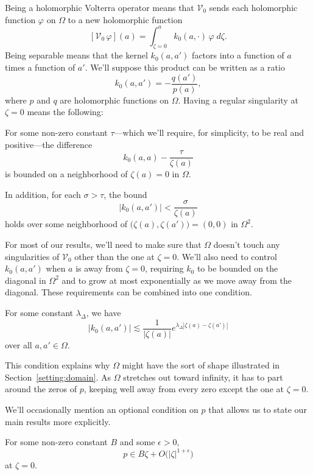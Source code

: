 \documentclass{article}
\makeatletter
\theoremstyle{plain}
\newcommand{\condconst}[2]{\item[($\text{\textsc{#1}} \mid #2$)]\protected@edef\@currentlabel{$\text{\textsc{#1}} \mid #2$}}
\newcommand{\hardpart}{\mathcal{V}_0}
\newcommand{\hardker}{k_0}
\newcommand{\domain}{\Omega}
\makeatother
\begin{document}
Being a holomorphic Volterra operator means that $\hardpart$ sends each holomorphic function $\varphi$ on $\domain$ to a new holomorphic function
\[ [\hardpart\,\varphi](a) = \int_{\zeta = 0}^a \hardker(a, \cdot)\,\varphi\;d\zeta. \]
Being separable means that the kernel $\hardker(a, a')$ factors into a function of $a$ times a function of $a'$. We'll suppose this product can be written as a ratio
\[ \hardker(a, a') = - \frac{q(a')}{p(a)}, \]
where $p$ and $q$ are holomorphic functions on $\domain$. Having a regular singularity at $\zeta = 0$ means the following:
\begin{conditions}
\condconst{sing}{\tau}\label{cond:sing} For some non-zero constant $\tau$---which we'll require, for simplicity, to be real and positive---the difference
\[ \hardker(a, a) - \frac{\tau}{\zeta(a)} \]
is bounded on a neighborhood of $\zeta(a) = 0$ in $\domain$.

In addition, for each $\sigma > \tau$, the bound
\[ \big|\hardker(a, a')\big| < \frac{\sigma}{\zeta(a)} \]
holds over some neighborhood of $\big(\zeta(a), \zeta(a')\big) = (0, 0)$ in $\domain^2$.
\end{conditions}
For most of our results, we'll need to make sure that $\domain$ doesn't touch any singularities of $\hardpart$ other than the one at $\zeta = 0$. We'll also need to control $\hardker(a, a')$ when $a$ is away from $\zeta = 0$, requiring $\hardker$ to be bounded on the diagonal in $\domain^2$ and to grow at most exponentially as we move away from the diagonal. These requirements can be combined into one condition.
\begin{conditions}
\condconst{diag$_0$}{\lambda_\Delta}\label{cond:diag-basic} For some constant $\lambda_\Delta$, we have
\[ \big| \hardker(a, a') \big| \lesssim \frac{1}{|\zeta(a)|} e^{\lambda_\Delta|\zeta(a)-\zeta(a')|} \]
over all $a, a' \in \domain$.
\end{conditions}
This condition explains why $\domain$ might have the sort of shape illustrated in Section~\ref{setting:domain}. As $\domain$ stretches out toward infinity, it has to part around the zeros of $p$, keeping well away from every zero except the one at $\zeta = 0$.

We'll occasionally mention an optional condition on $p$ that allows us to state our main results more explicitly.
\begin{conditions}
\condconst{reg-p}{B, \epsilon}\label{cond:reg-p}
For some non-zero constant $B$ and some $\epsilon > 0$,
\[ p \in B\zeta + O\big(|\zeta|^{1 + \epsilon}\big) \]
at $\zeta = 0$.
\end{conditions}
\end{document}
